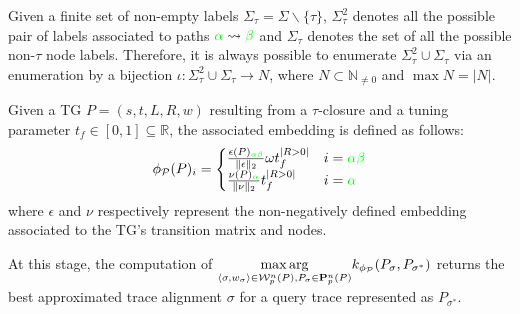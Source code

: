 \begin{definition}[TG Embedding]\label{def:ppne}
Given a finite set of non-empty labels $\Sigma_\tau =\Sigma\backslash\{\tau\}$, $\Sigma_\tau^2$ denotes all the possible pair of labels associated to paths ${\color{green}\alpha}\rightsquigarrow{\color{green}\beta}$ and $\Sigma_\tau$ denotes the set of all the possible non-$\tau$ node labels. Therefore, it is always possible to enumerate $\Sigma_\tau^2\cup\Sigma_\tau$ via an enumeration by a bijection $\iota\colon \Sigma_\tau^2\cup\Sigma_\tau\to  N$, where $N\subset \mathbb{N}_{\neq 0}$ and $\max N=|N|$.
	
Given a TG $P=(s,t,L,R,w)$ resulting from a $\tau$-closure and a tuning parameter $t_f\in[0,1]\subseteq\mathbb{R}$, the associated embedding is defined as follows:
$$\phi_{\mathcal{P}}(P)_i=\begin{cases}
	\frac{\epsilon(P)_{\color{green}\alpha\beta}}{\|\epsilon\|_2}\omega t_f^{|R>0|} & i={\color{green}\alpha\beta}\\
	\frac{\nu(P)_{\color{green}\alpha}}{\|\nu\|_2}t_f^{|R>0|} & i={\color{green}\alpha}\\
\end{cases}$$
where $\epsilon$ and $\nu$ respectively represent the non-negatively defined embedding associated to the TG's transition matrix and nodes.
\end{definition}

At this stage, the computation of $\underset{\braket{\sigma,w_\sigma}\in \mathcal{W}_p^n(P), P_\sigma\in\mathbf{P}_p^n(P)}{\max\arg} k_{\phi_\mathcal{P}}(P_\sigma, P_{\sigma^*})$ returns the best approximated trace alignment $\sigma$ for a query trace represented as $P_{\sigma^*}$. %


